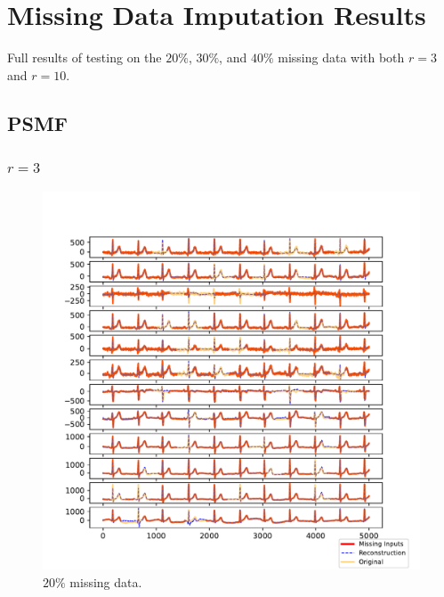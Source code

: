 \documentclass{mldsmsc}
\begin{document}
\chapter{Missing Data Imputation Results}\label{app:mdi}

Full results of testing on the $20\%$, $30\%$, and $40\%$ missing data with both $r = 3$ and $r = 10$.

\section{PSMF}

\subsection{$r = 3$}

\begin{figure}[H]
\centering
\begin{minipage}{0.4\linewidth}
    \centering
    \includegraphics[width=\linewidth]{images/missing/psmf_output_20_3.pdf}
    \caption{$20\%$ missing data.}
\end{minipage}%
\hspace{0.05\linewidth}
\begin{minipage}{0.4\linewidth}
    \centering

\end{minipage}
\end{figure}
\end{document}
